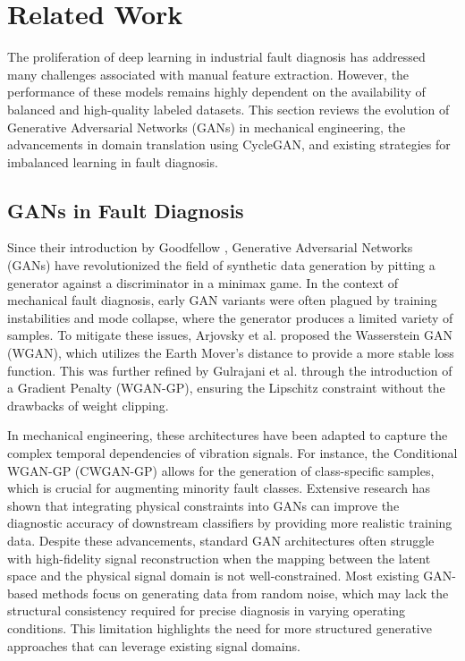 \section{Related Work}
\label{sec:related_work}
The proliferation of deep learning in industrial fault diagnosis has addressed many challenges associated with manual feature extraction. However, the performance of these models remains highly dependent on the availability of balanced and high-quality labeled datasets. This section reviews the evolution of Generative Adversarial Networks (GANs) in mechanical engineering, the advancements in domain translation using CycleGAN, and existing strategies for imbalanced learning in fault diagnosis.

\subsection{GANs in Fault Diagnosis}
Since their introduction by Goodfellow \cite{1}, Generative Adversarial Networks (GANs) have revolutionized the field of synthetic data generation by pitting a generator against a discriminator in a minimax game. In the context of mechanical fault diagnosis, early GAN variants were often plagued by training instabilities and mode collapse, where the generator produces a limited variety of samples. To mitigate these issues, Arjovsky et al. \cite{2} proposed the Wasserstein GAN (WGAN), which utilizes the Earth Mover's distance to provide a more stable loss function. This was further refined by Gulrajani et al. \cite{3} through the introduction of a Gradient Penalty (WGAN-GP), ensuring the Lipschitz constraint without the drawbacks of weight clipping.

In mechanical engineering, these architectures have been adapted to capture the complex temporal dependencies of vibration signals. For instance, the Conditional WGAN-GP (CWGAN-GP) \cite{7} allows for the generation of class-specific samples, which is crucial for augmenting minority fault classes. Extensive research has shown that integrating physical constraints into GANs can improve the diagnostic accuracy of downstream classifiers by providing more realistic training data. Despite these advancements, standard GAN architectures often struggle with high-fidelity signal reconstruction when the mapping between the latent space and the physical signal domain is not well-constrained. Most existing GAN-based methods focus on generating data from random noise, which may lack the structural consistency required for precise diagnosis in varying operating conditions. This limitation highlights the need for more structured generative approaches that can leverage existing signal domains.

